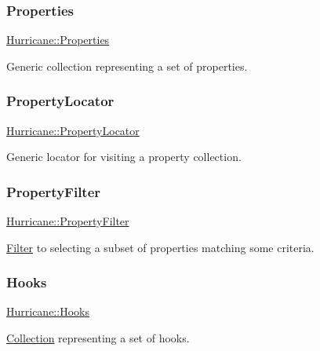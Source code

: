 \subsubsection{\texorpdfstring{Properties}{Properties}}
{\footnotesize\ttfamily \mbox{\hyperlink{namespaceHurricane_afd7bca6dad4be54b7c03b0463e6c0004}{Hurricane\+::\+Properties}}}

Generic collection representing a set of properties. \mbox{\label{namespaceHurricane_a91d71616b5784225dfd4296487e49c07}} 
\subsubsection{\texorpdfstring{Property\+Locator}{PropertyLocator}}
{\footnotesize\ttfamily \mbox{\hyperlink{namespaceHurricane_a91d71616b5784225dfd4296487e49c07}{Hurricane\+::\+Property\+Locator}}}

Generic locator for visiting a property collection. \mbox{\label{namespaceHurricane_a9e98e66d188d506145a5e92045691777}} 
\subsubsection{\texorpdfstring{Property\+Filter}{PropertyFilter}}
{\footnotesize\ttfamily \mbox{\hyperlink{namespaceHurricane_a9e98e66d188d506145a5e92045691777}{Hurricane\+::\+Property\+Filter}}}

\mbox{\hyperlink{classHurricane_1_1Filter}{Filter}} to selecting a subset of properties matching some criteria. \mbox{\label{namespaceHurricane_a9dcd9b74dc5e2b51bec7a13c25807e02}} 
\subsubsection{\texorpdfstring{Hooks}{Hooks}}
{\footnotesize\ttfamily \mbox{\hyperlink{namespaceHurricane_a9dcd9b74dc5e2b51bec7a13c25807e02}{Hurricane\+::\+Hooks}}}

\mbox{\hyperlink{classHurricane_1_1Collection}{Collection}} representing a set of hooks. \mbox{\label{namespaceHurricane_aca3a5babe6265eb9f140112d8e8b79e6}} 

